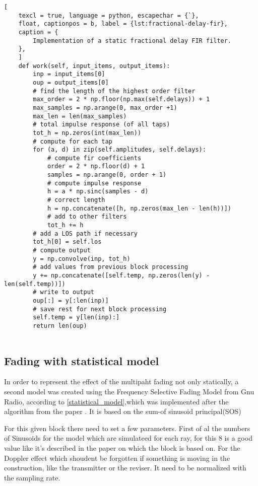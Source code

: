 
\begin{lstlisting}[
	texcl = true, language = python, escapechar = {`},
	float, captionpos = b, label = {lst:fractional-delay-fir},
	caption = {
		Implementation of a static fractional delay FIR filter.
	},
	]
	def work(self, input_items, output_items):
		inp = input_items[0]
		oup = output_items[0]
		# find the length of the highest order filter
		max_order = 2 * np.floor(np.max(self.delays)) + 1
		max_samples = np.arange(0, max_order +1)
		max_len = len(max_samples)
		# total impulse response (of all taps)
		tot_h = np.zeros(int(max_len))
		# compute for each tap
		for (a, d) in zip(self.amplitudes, self.delays):
			# compute fir coefficients
			order = 2 * np.floor(d) + 1
			samples = np.arange(0, order + 1)
			# compute impulse response
			h = a * np.sinc(samples - d)
			# correct length
			h = np.concatenate([h, np.zeros(max_len - len(h))])
			# add to other filters
			tot_h += h
		# add a LOS path if necessary
		tot_h[0] = self.los
		# compute output
		y = np.convolve(inp, tot_h)
		# add values from previous block processing
		y += np.concatenate([self.temp, np.zeros(len(y) - len(self.temp))])
		# write to output
		oup[:] = y[:len(inp)]
		# save rest for next block processing
		self.temp = y[len(inp):]
		return len(oup)
	
\end{lstlisting}

\subsection{Fading with statistical model}

	

In order to represent the effect of the multipaht fading not only statically, a second model was created using the Frequency Selective Fading Model from Gnu Radio, according to \ref{statistical_model},which was implemented after the algorithm from the paper \cite{Alimohammad2009}. It is based on the sum-of sinusoid principal(SOS)

For this given block there need to set a few parameters. First of al the numbers of Sinusoids for the model which are simulateed for each ray, for this 8 is a good value like it's described in the paper on which the block is based on.
For the Doppler effect which shoudent be forgotten if something is moving in the construction, like the transmitter or the reviser. It need to be normalized with the sampling rate. 

